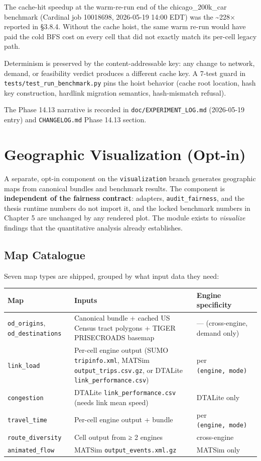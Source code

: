 The cache-hit speedup at the warm-re-run end of the chicago\_200k\_car
benchmark (Cardinal job 10018698, 2026-05-19 14:00 EDT) was the
\textasciitilde228× reported in §3.8.4. Without the cache hoist, the
same warm re-run would have paid the cold BFS cost on every cell that
did not exactly match its per-cell legacy path.

Determinism is preserved by the content-addressable key: any change to
network, demand, or feasibility verdict produces a different cache key.
A 7-test guard in \texttt{tests/test\_run\_benchmark.py} pins the hoist
behavior (cache root location, hash key construction, hardlink migration
semantics, hash-mismatch refusal).

The Phase 14.13 narrative is recorded in \texttt{doc/EXPERIMENT\_LOG.md}
(2026-05-19 entry) and \texttt{CHANGELOG.md} Phase 14.13 section.

\section{Geographic Visualization
(Opt-in)}\label{39-geographic-visualization-opt-in}

A separate, opt-in component on the \texttt{visualization} branch
generates geographic maps from canonical bundles and benchmark results.
The component is \textbf{independent of the fairness contract}:
adapters, \texttt{audit\_fairness}, and the thesis runtime numbers do
not import it, and the locked benchmark numbers in Chapter 5 are
unchanged by any rendered plot. The module exists to \emph{visualize}
findings that the quantitative analysis already establishes.

\subsection{Map Catalogue}\label{391-map-catalogue}

Seven map types are shipped, grouped by what input data they need:

\begin{longtable}[]{@{}lll@{}}
\toprule\noalign{}
Map & Inputs & Engine specificity \\
\midrule\noalign{}
\endhead
\bottomrule\noalign{}
\endlastfoot
\texttt{od\_origins}, \texttt{od\_destinations} & Canonical bundle +
cached US Census tract polygons + TIGER PRISECROADS basemap & ---
(cross-engine, demand only) \\
\texttt{link\_load} & Per-cell engine output (SUMO
\texttt{tripinfo.xml}, MATSim \texttt{output\_trips.csv.gz}, or DTALite
\texttt{link\_performance.csv}) & per \texttt{(engine,\ mode)} \\
\texttt{congestion} & DTALite \texttt{link\_performance.csv} (needs link
mean speed) & DTALite only \\
\texttt{travel\_time} & Per-cell engine output + bundle & per
\texttt{(engine,\ mode)} \\
\texttt{route\_diversity} & Cell output from ≥ 2 engines &
cross-engine \\
\texttt{animated\_flow} & MATSim \texttt{output\_events.xml.gz} & MATSim
only \\
\end{longtable}

